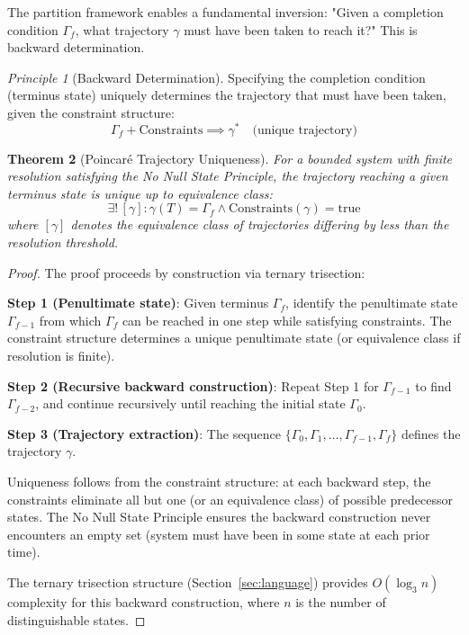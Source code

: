 \documentclass[aps,prd,twocolumn,superscriptaddress,floatfix,nofootinbib]{revtex4-2}
\newtheorem{theorem}{Theorem}[section]
\theoremstyle{remark}
\newtheorem{principle}[theorem]{Principle}
\begin{document}
The partition framework enables a fundamental inversion: "Given a completion condition $\Gamma_f$, what trajectory $\gamma$ must have been taken to reach it?" This is backward determination.

\begin{principle}[Backward Determination]
\label{princ:backward_determination}
Specifying the completion condition (terminus state) uniquely determines the trajectory that must have been taken, given the constraint structure:
\begin{equation}
\Gamma_f + \text{Constraints} \implies \gamma^* \quad \text{(unique trajectory)}
\end{equation}
\end{principle}

\begin{theorem}[Poincaré Trajectory Uniqueness]
\label{thm:poincare_uniqueness}
For a bounded system with finite resolution satisfying the No Null State Principle, the trajectory reaching a given terminus state is unique up to equivalence class:
\begin{equation}
\exists! \, [\gamma] : \gamma(T) = \Gamma_f \land \text{Constraints}(\gamma) = \text{true}
\end{equation}
where $[\gamma]$ denotes the equivalence class of trajectories differing by less than the resolution threshold.
\end{theorem}

\begin{proof}
The proof proceeds by construction via ternary trisection:

\textbf{Step 1 (Penultimate state)}: Given terminus $\Gamma_f$, identify the penultimate state $\Gamma_{f-1}$ from which $\Gamma_f$ can be reached in one step while satisfying constraints. The constraint structure determines a unique penultimate state (or equivalence class if resolution is finite).

\textbf{Step 2 (Recursive backward construction)}: Repeat Step 1 for $\Gamma_{f-1}$ to find $\Gamma_{f-2}$, and continue recursively until reaching the initial state $\Gamma_0$.

\textbf{Step 3 (Trajectory extraction)}: The sequence $\{\Gamma_0, \Gamma_1, \ldots, \Gamma_{f-1}, \Gamma_f\}$ defines the trajectory $\gamma$.

Uniqueness follows from the constraint structure: at each backward step, the constraints eliminate all but one (or an equivalence class) of possible predecessor states. The No Null State Principle ensures the backward construction never encounters an empty set (system must have been in some state at each prior time).

The ternary trisection structure (Section~\ref{sec:language}) provides $O(\log_3 n)$ complexity for this backward construction, where $n$ is the number of distinguishable states.
\end{proof}
\end{document}
